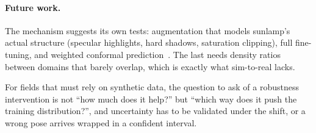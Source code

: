 \documentclass{article}
\begin{document}
\paragraph{Future work.} The mechanism suggests its own tests: augmentation that models
sunlamp's actual structure (specular highlights, hard shadows, saturation clipping), full
fine-tuning, and weighted conformal prediction~\citep{tibshirani2019covariate}. The last needs
density ratios between domains that barely overlap, which is exactly what sim-to-real lacks.

For fields that must rely on synthetic data, the question to ask of a robustness intervention
is not ``how much does it help?'' but ``which way does it push the training distribution?'',
and uncertainty has to be validated under the shift, or a wrong pose arrives wrapped in a
confident interval.




\newpage
\appendix

\end{document}
